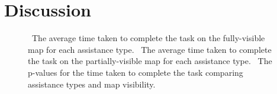 \section{Discussion}
\label{sec:conclusion}

\begin{figure}[t!]
    \centering
        \label{fig:charts}
         \caption{\protect{}~The average time taken to complete the task on the fully-visible map for each assistance type. \protect{}~The average time taken to complete the task on the partially-visible map for each assistance type. \protect{}~The p-values for the time taken to complete the task comparing assistance types and map visibility. }
\end{figure}

